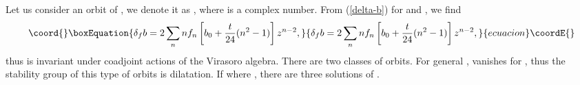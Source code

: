 \documentclass[a4paper,11pt]{article}
\begin{document}
Let us consider an orbit of \coordHE{}, 
we denote it as \coordHE{}, where \coordHE{} is a complex number.
From (\ref{delta-b}) for \coordHE{} and 
\coordHE{}, we find 
\begin{equation}\coord{}\boxEquation{
 \delta_f b=2\sum_n n f_n\left[b_0+\frac{t}{24}(n^2-1)\right] z^{n-2},
}{
 \delta_f b=2\sum_n n f_n\left[b_0+\frac{t}{24}(n^2-1)\right] z^{n-2},
}{ecuacion}\coordE{}\end{equation}
thus \coordHE{} is invariant under coadjoint actions of the Virasoro algebra.
There are two classes of orbits.
For general \coordHE{}, \coordHE{} vanishes for \coordHE{}, thus the stability
group of this type of orbits is dilatation. 
If \coordHE{} where \coordHE{}, 
there are three solutions \coordHE{} of \coordHE{}.
\end{document}
